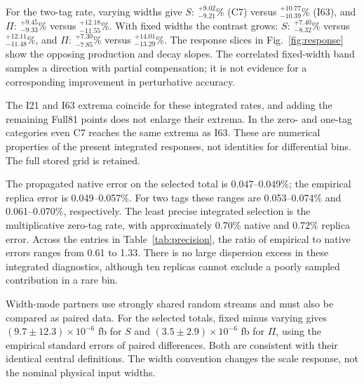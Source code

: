\documentclass[11pt,a4paper]{article}
\begin{document}
\begin{table}[htbp]\centering\small
\resizebox{.98\linewidth}{!}{}
\caption{Scale envelopes relative to each mean central rate, in percent.
Full81 additionally includes the extreme production
$\mu_R/\mu_F$ ratios excluded from the usual seven-point set.}
\label{tab:scales}
\end{table}
For the two-tag rate, varying widths give
$S:\ {}^{+9.02}_{-9.21}$\% (C7) versus
${}^{+10.77}_{-10.39}$\% (I63), and
$\Pi:\ {}^{+9.45}_{-9.33}$\% versus
${}^{+12.18}_{-11.55}$\%.
With fixed widths the contrast grows:
$S:\ {}^{+7.40}_{-8.32}$\% versus
${}^{+12.11}_{-11.48}$\%, and
$\Pi:\ {}^{+7.30}_{-7.85}$\% versus
${}^{+14.01}_{-13.29}$\%.
The response slices in Fig.~\ref{fig:response} show the opposing
production and decay slopes. The correlated fixed-width band samples
a direction with partial compensation; it is not evidence for a
corresponding improvement in perturbative accuracy.

The I21 and I63 extrema coincide for these integrated rates, and adding
the remaining Full81 points does not enlarge their extrema. In the
zero- and one-tag categories even C7 reaches the same extrema as I63.
These are numerical properties of the present integrated responses,
not identities for differential bins. The full stored grid is retained.

\begin{table}[htbp]\centering\small
\resizebox{.98\linewidth}{!}{}
\caption{Precision of each ten-replica mean. Native MC errors propagate
the saved integration errors; replica standard errors use the scatter
of the ten central estimates. Their ratio is a dispersion diagnostic,
not a formal goodness-of-fit probability.}
\label{tab:precision}
\end{table}
The propagated native error on the selected total is 0.047--0.049\%;
the empirical replica error is 0.049--0.057\%. For two tags these
ranges are 0.053--0.074\% and 0.061--0.070\%, respectively.
The least precise integrated selection is the multiplicative zero-tag
rate, with approximately 0.70\% native and 0.72\% replica error.
Across the entries in Table~\ref{tab:precision}, the ratio of empirical
to native errors ranges from 0.61 to 1.33. There is no large dispersion
excess in these integrated diagnostics, although ten replicas cannot
exclude a poorly sampled contribution in a rare bin.

Width-mode partners use strongly shared random streams and must also
be compared as paired data. For the selected totals, fixed minus
varying gives $(9.7\pm12.3)\times10^{-6}$ fb for $S$ and
$(3.5\pm2.9)\times10^{-6}$ fb for $\Pi$, using the empirical standard
errors of paired differences. Both are consistent with their identical
central definitions. The width convention changes the scale response,
not the nominal physical input widths.
\end{document}
